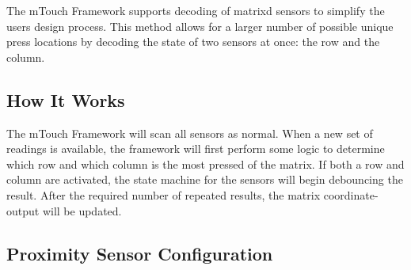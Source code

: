 The m\+Touch Framework supports decoding of matrix\textquotesingle{}d sensors to simplify the user\textquotesingle{}s design process. This method allows for a larger number of possible unique press locations by decoding the state of two sensors at once\+: the row and the column.\hypertarget{feat_matrix_featMatrix-How}{}\subsection{How It Works}\label{feat_matrix_featMatrix-How}
The m\+Touch Framework will scan all sensors as normal. When a new set of readings is available, the framework will first perform some logic to determine which row and which column is the most pressed of the matrix. If both a row and column are activated, the state machine for the sensors will begin debouncing the result. After the required number of repeated results, the matrix coordinate-\/output will be updated.

 \hypertarget{feat_matrix_featMatrix-Config}{}\subsection{Proximity Sensor Configuration}\label{feat_matrix_featMatrix-Config}

